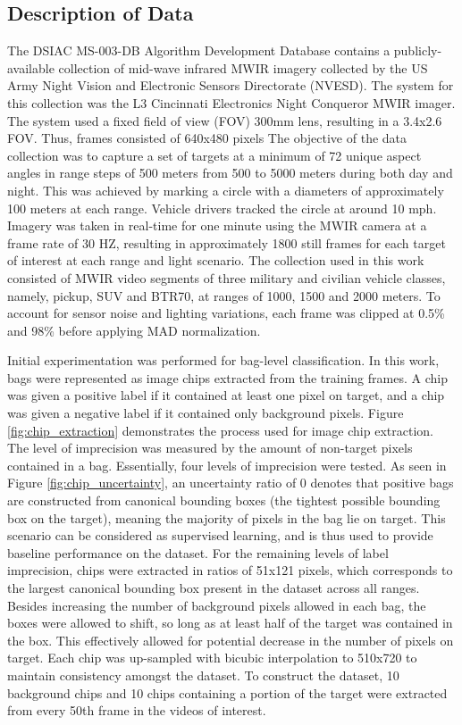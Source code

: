 \subsection{Description of Data}
The DSIAC MS-003-DB Algorithm Development Database \citep{DSIACATR} contains a publicly-available collection of mid-wave infrared MWIR imagery collected by the US Army Night Vision and Electronic Sensors Directorate (NVESD). The system for this collection was the L3 Cincinnati Electronics Night Conqueror MWIR imager. The system used a fixed field of view (FOV) 300mm lens, resulting in a 3.4x2.6 FOV.  Thus, frames consisted of 640x480 pixels  The objective of the data collection was to capture a set of targets at a minimum of 72 unique aspect angles in range steps of 500 meters from 500 to 5000 meters during both day and night.  This was achieved by marking a circle with a diameters of approximately 100 meters at each range.  Vehicle drivers tracked the circle at around 10 mph. Imagery was taken in real-time for one minute using the  MWIR camera at a frame rate of 30 HZ, resulting in approximately 1800 still frames for each target of interest at each range and light scenario.  The collection used in this work consisted of MWIR video segments of three military and civilian vehicle classes, namely, pickup, SUV and BTR70, at ranges of 1000, 1500 and 2000 meters.  To account for sensor noise and lighting variations,  each frame was clipped at 0.5\% and 98\% before applying MAD normalization.
 
Initial experimentation was performed for bag-level classification.  In this work, bags were represented as image chips extracted from the training frames.  A chip was given a positive label if it contained at least one pixel on target, and a chip was given a negative label if it contained only background pixels.   Figure \ref{fig:chip_extraction} demonstrates the process used for image chip extraction.  The level of imprecision was measured by the amount of non-target pixels contained in a bag.  Essentially, four levels of imprecision were tested.  As seen in Figure \ref{fig:chip_uncertainty}, an uncertainty ratio of 0 denotes that positive bags are constructed from canonical bounding boxes (the tightest possible bounding box on the target), meaning the majority of pixels in the bag lie on target.  This scenario can be considered as supervised learning, and is thus used to provide baseline performance on the dataset. For the remaining levels of label imprecision, chips were extracted in ratios of 51x121 pixels, which corresponds to the largest canonical bounding box present in the dataset across all ranges.  Besides increasing the number of background pixels allowed in each bag, the boxes were  allowed to shift, so long as at least half of the target was contained in the box.  This effectively allowed for potential decrease in the number of pixels on target.  Each chip was up-sampled with bicubic interpolation to 510x720 to maintain consistency amongst the dataset.  To construct the dataset, 10 background chips and 10 chips containing a portion of the target were extracted from every 50th frame in the videos of interest.


